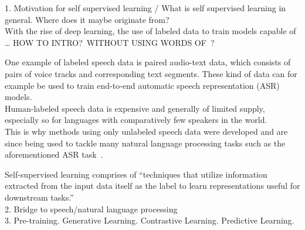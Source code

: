 1. Motivation for self supervised learning / What is self supervised learning in general. Where does it maybe originate from?\\
With the rise of deep learning, the use of labeled data to train models capable of \dots
HOW TO INTRO?~WITHOUT USING WORDS OF~\cite{srl-review}?

One example of labeled speech data is paired audio-text data, which consists of pairs of voice tracks and corresponding text segments. These kind of data can for example be used to train end-to-end automatic speech representation (ASR) models.\\Human-labeled speech data is expensive and generally of limited supply, especially so for languages with comparatively few speakers in the world.\\This is why methods using only unlabeled speech data were developed and are since being used to tackle many natural language processing tasks such as the aforementioned ASR task~\cite{unsupervised_learning}.

Self-supervised learning comprises of \enquote{techniques that utilize information extracted from the input data itself as the label to learn representations useful
for downstream tasks.}~\cite{srl-review}\\
2. Bridge to speech/natural language processing\\
3. Pre-training. Generative Learning. Contrastive Learning. Predictive Learning.